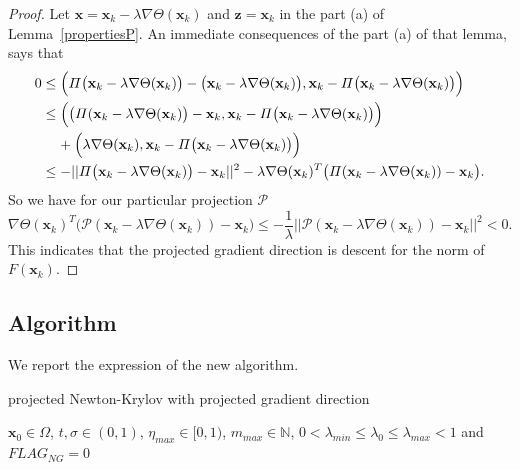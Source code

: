 \begin{proof}
	Let $ \textbf{x} = \textbf{x}_k - \lambda \nabla \Theta (\textbf{x}_k)$ and $ \textbf{z}= \textbf{x}_k $ in the part (a) of Lemma~\ref{propertiesP}. An immediate consequences of the part (a) of that lemma, says that 
	\begin{align*}
	0 & \leq \Bigl( \varPi \bigl(\textbf{x}_k - \lambda \nabla \Theta (\textbf{x}_k) \bigr) - \bigl(\textbf{x}_k - \lambda \nabla \Theta (\textbf{x}_k) \bigr), \textbf{x}_k - \varPi \bigl(\textbf{x}_k - \lambda \nabla \Theta (\textbf{x}_k)\bigr)\Bigr)\\
	& \leq \Bigl( \bigl(\varPi(\textbf{x}_k - \lambda \nabla \Theta (\textbf{x}_k)\bigr) - \textbf{x}_k , \textbf{x}_k-\varPi \bigl(\textbf{x}_k -  \lambda \nabla \Theta (\textbf{x}_k)\bigr) \Bigr) \\
	& \; \; \; \; + \Bigl( \lambda \nabla \Theta (\textbf{x}_k), \textbf{x}_k - \varPi \bigl(\textbf{x}_k - \lambda \nabla \Theta (\textbf{x}_k) \bigr)\Bigr)\\
	& \leq - ||\varPi \bigl(\textbf{x}_k - \lambda \nabla \Theta(\textbf{x}_k)\bigr) - \textbf{x}_k||^2 - \lambda \nabla \Theta(\textbf{x}_k)^T \bigl(\varPi(\textbf{x}_k - \lambda \nabla \Theta (\textbf{x}_k))-\textbf{x}_k\bigr).
	\end{align*}
	So we have for our particular projection $ \mathcal{P} $
	\begin{equation}
	\label{9P}
	\nabla\Theta (\textbf{x}_k)^T \bigl(\mathcal{P}(\textbf{x}_k - \lambda \nabla \Theta(\textbf{x}_k)) - \textbf{x}_k \bigr)\leq -\frac{1}{\lambda} ||\mathcal{P}(\textbf{x}_k -\lambda \nabla \Theta (\textbf{x}_k))- \textbf{x}_k||^2 < 0.
	\end{equation}
	This indicates that the projected gradient direction is descent for the norm of $ F(\textbf{x}_k) $.
\end{proof}

\subsection{Algorithm}
We report the expression of the new algorithm. \\

\begin{algorithm}[H]
	\caption{projected Newton-Krylov with projected gradient direction}
	\label{pNK}
	\begin{algorithmic}[1]
		\STATE 	$ \textbf{x}_0 \in \Omega $, $ t, \sigma \in (0,1) $, $ \eta_{max} \in [0,1) $, $ m_{max} \in \mathbb{N}  $, $ 0 <  \lambda_{min} \leq \lambda_0 \leq \lambda_{max} < 1$ and $ FLAG_{NG} = 0 $
	\end{algorithmic}
\end{algorithm}

